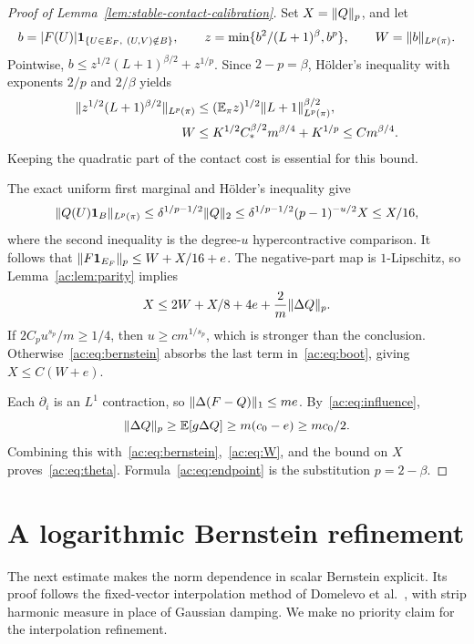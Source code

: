 \begin{proof}[Proof of Lemma~\ref{lem:stable-contact-calibration}]
Set $X=\lVert Q\rVert_{p}$, and let
\[
 b=|F(U)|\mathbf1_{\{U\in E_F,\ (U,V)\notin B\}},\qquad
 z=\min\{b^2/(L+1)^\beta,b^p\},\qquad W=\lVert b\rVert_{L^p(\pi)}.
\]
Pointwise,
$b\le z^{1/2}(L+1)^{\beta/2}+z^{1/p}$.
Since $2-p=\beta$, H\"older's inequality with exponents $2/p$ and $2/\beta$ yields
\begin{align}
 \lVert z^{1/2}(L+1)^{\beta/2}\rVert_{L^p(\pi)}
 &\le(\mathbb E_\pi z)^{1/2}\lVert L+1\rVert_{L^p(\pi)}^{\beta/2},\label{ac:eq:holder}\\
 W&\le K^{1/2}C_*^{\beta/2}m^{\beta/4}+K^{1/p}
 \le C m^{\beta/4}.\label{ac:eq:W}
\end{align}
Keeping the quadratic part of the contact cost is essential for this bound.

The exact uniform first marginal and H\"older's inequality give
\[
 \lVert Q(U)\mathbf1_B\rVert_{L^p(\pi)}
 \le\delta^{1/p-1/2}\lVert Q\rVert_{2}
 \le\delta^{1/p-1/2}(p-1)^{-u/2}X\le X/16,
\]
where the second inequality is the degree-$u$ hypercontractive comparison.
It follows that
$\lVert F\mathbf1_{E_F}\rVert_{p}\le W+X/16+e$.
The negative-part map is $1$-Lipschitz, so Lemma~\ref{ac:lem:parity} implies
\begin{equation}\label{ac:eq:boot}
 X\le2W+X/8+4e+\frac2m\lVert \Delta Q\rVert_{p}.
\end{equation}
If $2C_pu^{s_p}/m\ge1/4$, then $u\ge c m^{1/s_p}$, which is stronger than the conclusion. Otherwise~\eqref{ac:eq:bernstein} absorbs the last term in~\eqref{ac:eq:boot}, giving $X\le C(W+e)$.

Each $\partial_i$ is an $L^1$ contraction, so
$\lVert \Delta(F-Q)\rVert_{1}\le me$. By~\eqref{ac:eq:influence},
\[
 \lVert \Delta Q\rVert_{p}\ge\mathbb E[g\Delta Q]\ge m(c_0-e)\ge mc_0/2.
\]
Combining this with~\eqref{ac:eq:bernstein},~\eqref{ac:eq:W}, and the bound on $X$ proves~\eqref{ac:eq:theta}. Formula~\eqref{ac:eq:endpoint} is the substitution $p=2-\beta$.
\end{proof}

\section{A logarithmic Bernstein refinement}\label{ac:sec:log}
The next estimate makes the norm dependence in scalar Bernstein explicit. Its proof follows the fixed-vector interpolation method of Domelevo et al.\ \cite{Domelevo}, with strip harmonic measure in place of Gaussian damping. We make no priority claim for the interpolation refinement.

